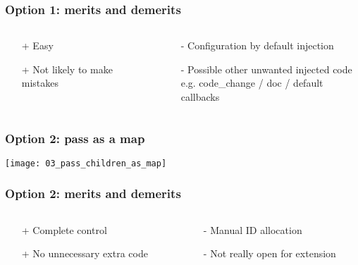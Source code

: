 \begin{frame}
    \frametitle{Option 1: merits and demerits}
    \begin{columns}

        \begin{column}{0.5\textwidth}
            \begin{itemize}
                \item[+] Easy
                \item[+] Not likely to make mistakes
            \end{itemize}
        \end{column}

        \begin{column}{0.5\textwidth}
            \begin{itemize}
                \item[-] Configuration by default injection
                \item[-] Possible other unwanted injected code
                      \footnotesize
                      \\ e.g. code\_change / doc / default callbacks
            \end{itemize}
        \end{column}
    \end{columns}
\end{frame}

\begin{frame}
    \frametitle{Option 2: pass as a map}
    \texttt{[image: 03\_pass\_children\_as\_map]}
\end{frame}

\begin{frame}
    \frametitle{Option 2: merits and demerits}
    \begin{columns}

        \begin{column}{0.5\textwidth}
            \begin{itemize}
                \item[+] Complete control
                \item[+] No unnecessary extra code
            \end{itemize}
        \end{column}

        \begin{column}{0.5\textwidth}
            \begin{itemize}
                \item[-] Manual ID allocation
                \item[-] Not really open for extension
            \end{itemize}
        \end{column}
    \end{columns}
\end{frame}

